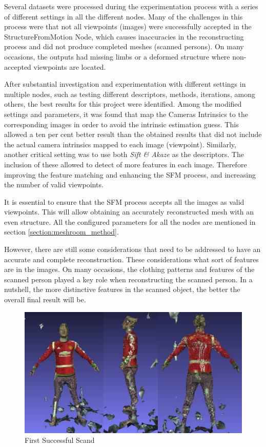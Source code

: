 \documentclass[12pt]{report}
\begin{document}
Several datasets were processed during the experimentation process with a series of different settings in all the different nodes. 
Many of the challenges in this process were that not all viewpoints (images) were successfully accepted in the StructureFromMotion Node, which causes inaccuracies in the reconstructing process and did not produce completed meshes (scanned persons).
On many occasions, the outputs had missing limbs or a deformed structure where non-accepted viewpoints are located.

After substantial investigation and experimentation with different settings in multiple nodes, such as testing different descriptors, methods, iterations, among others, the best results for this project were identified.
Among the modified settings and parameters, it was found that map the Cameras Intrinsics to the corresponding images in order to avoid the intrinsic estimation guess. 
This allowed a ten per cent better result than the obtained results that did not include the actual camera intrinsics mapped to each image (viewpoint).
Similarly, another critical setting was to use both \textit{Sift \& Akaze} as the descriptors. The inclusion of these allowed to detect of more features in each image. 
Therefore improving the feature matching and enhancing the SFM process, and increasing the number of valid viewpoints.

It is essential to ensure that the SFM process accepts all the images as valid viewpoints. This will allow obtaining an accurately reconstructed mesh with an even structure.
All the configured parameters for all the nodes are mentioned in section \ref{section:meshroom_method}.

However, there are still some considerations that need to be addressed to have an accurate and complete reconstruction. 
These considerations what sort of features are in the images. On many occasions, the clothing patterns and features of the scanned person played a key role when reconstructing the scanned person. 
In a nutshell, the more distinctive features in the scanned object, the better the overall final result will be. 

\begin{figure}[H]%
  \centering
 \includegraphics[width=1\textwidth]{scan1.png}
\caption{First Successful Scand}
\label{fig:scan1} 
\end{figure}
\end{document}
